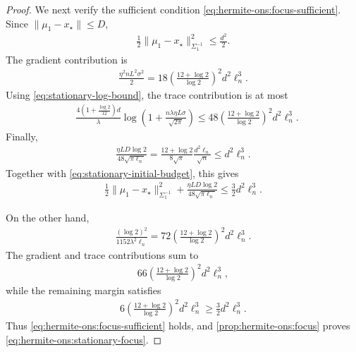 \documentclass{article}
\theoremstyle{plain}
\theoremstyle{definition}
\theoremstyle{plain}
\begin{document}
\begin{proof}
    We next verify the sufficient condition
    \eqref{eq:hermite-ons:focus-sufficient}.
    Since
    $\|\mu_1-x_\star\|\leq D$,
    \begin{align}
        \frac12
        \|\mu_1-x_\star\|_{\Sigma_1^{-1}}^2
        \leq
        \frac{d^2}{2}.
        \label{eq:stationary-initial-budget}
    \end{align}
    The gradient contribution is
    \begin{align}
        \frac{\eta^2nL^2\sigma^2}{2}
        =
        18
        \left(
        \frac{12+\log2}{\log2}
        \right)^2
        d^2\ell_n^3.
        \label{eq:stationary-gradient-focus-budget}
    \end{align}
    Using \eqref{eq:stationary-log-bound}, the trace contribution is at
    most
    \begin{align}
         & \frac{
            4\left(1+\frac{\log2}{12}\right)d
        }{\lambda}
        \log\left(
        1+
        \frac{n\lambda\eta L\sigma}{\sqrt{2\pi}}
        \right)
        \leq
        48
        \left(
        \frac{12+\log2}{\log2}
        \right)^2
        d^2\ell_n^3.
        \label{eq:stationary-trace-focus-budget}
    \end{align}
    Finally,
    \begin{align}
        \frac{\eta LD\log2}
        {48\sqrt{\pi\ell_n}}
        =
        \frac{12+\log2}{8\sqrt\pi}
        \frac{d^2\ell_n}{\sqrt n}
        \leq
        d^2\ell_n^3.
        \label{eq:stationary-tail-focus-budget}
    \end{align}
    Together with \eqref{eq:stationary-initial-budget}, this gives
    \begin{align}
        \frac12
        \|\mu_1-x_\star\|_{\Sigma_1^{-1}}^2
        +
        \frac{\eta LD\log2}
        {48\sqrt{\pi\ell_n}}
        \leq
        \frac32d^2\ell_n^3.
    \end{align}

    On the other hand,
    \begin{align}
        \frac{(\log2)^2}
        {1152\lambda^2\ell_n}
        =
        72
        \left(
        \frac{12+\log2}{\log2}
        \right)^2
        d^2\ell_n^3.
        \label{eq:stationary-focus-radius}
    \end{align}
    The gradient and trace contributions sum to
    \begin{align}
        66
        \left(
        \frac{12+\log2}{\log2}
        \right)^2
        d^2\ell_n^3,
    \end{align}
    while the remaining margin satisfies
    \begin{align}
        6
        \left(
        \frac{12+\log2}{\log2}
        \right)^2
        d^2\ell_n^3
        \geq
        \frac32d^2\ell_n^3.
    \end{align}
    Thus \eqref{eq:hermite-ons:focus-sufficient} holds, and
    \cref{prop:hermite-ons:focus} proves
    \eqref{eq:hermite-ons:stationary-focus}.


\end{proof}
\end{document}

